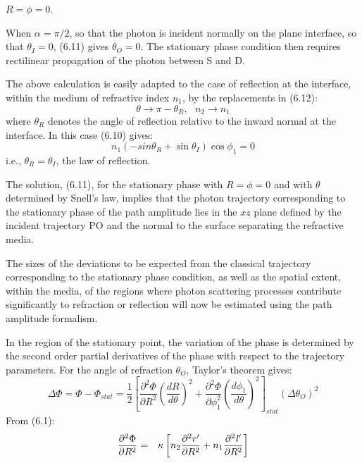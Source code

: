 \documentclass [12pt]{article}
\begin{document}
{  $R = \phi =0$.
  \par When $\alpha = \pi/2$, so that the photon is incident  normally on the plane interface,
   so that $\theta_I =0$,
   (6.11) gives $\theta_O = 0$. The stationary phase condition then 
 requires rectilinear propagation of the photon between S and D. 
  \par The above calculation is easily adapted to the case of reflection at the interface,
   within the medium of refractive index $n_1$, by the replacements in (6.12):
  \[ \theta \rightarrow \pi -\theta_R,~~~n_2 \rightarrow n_1 \]
   where $\theta_R$ denotes the angle of reflection relative to the inward normal at the interface.
   In this case (6.10) gives:
  \begin{equation}
 n_1(-sin \theta_R + \sin  \theta_I) \cos \phi_1 = 0
\end{equation}
 i.e., $ \theta_R =  \theta_I$, the law of reflection.
 \par The solution, (6.11), for the stationary phase with $R = \phi = 0$ and with 
  $\theta$ determined by Snell's law, implies that the photon trajectory
  corresponding to the stationary phase of the path amplitude lies in 
   the $xz$ plane defined by the incident trajectory PO and the normal to the surface
    separating the refractive media.
  \par The sizes of the deviations to be expected from the classical trajectory corresponding
  to the stationary  phase condition, as well as the spatial extent, within the media, of the regions where
  photon scattering processes contribute significantly to refraction or reflection will now be
   estimated using the path amplitude formalism.
  \par In the region of the stationary point, the variation of the phase is determined by the
   second order partial derivatives of the phase with respect to the trajectory parameters.
   For the angle of refraction $\theta_O$, Taylor's theorem gives:
   \begin{equation}
 \Delta \Phi =  \Phi - \Phi_{stat}= \frac{1}{2}\left[\frac{\partial^2 \Phi}{\partial R^2}
  \left(\frac{d R}{d \theta}\right)^2+
 \frac{\partial^2 \Phi}{\partial\phi_1^2}
  \left(\frac{d \phi_1}{d \theta}\right)^2 \right]_{stat} (\Delta \theta_O)^2
 \end{equation}
 From (6.1):
 \begin{eqnarray}
 \frac{\partial^2 \Phi}{\partial R^2} & = & \kappa \left[n_2  \frac{\partial^2 r'}{\partial R^2}
  + n_1  \frac{\partial^2 {\it l}'}{\partial R^2}\right] \\

\end{eqnarray}}
\end{document}
